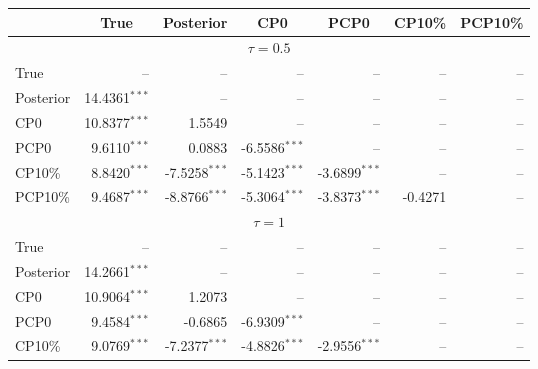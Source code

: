 { \renewcommand{\arraystretch}{1.2} 
 {\footnotesize 
\begin{table} 
\center 
\begin{tabular}{l | rrrrrr} 
& \multicolumn{1}{c}{True}& \multicolumn{1}{c}{Posterior}& \multicolumn{1}{c}{CP0}& \multicolumn{1}{c}{PCP0}& \multicolumn{1}{c}{CP10\%}& \multicolumn{1}{c}{PCP10\%} \\ \hline 
\multicolumn{7}{c}{$\tau = 0.5$} \\ \hline 
True &    --\phantom{$^{***}$} &    --\phantom{$^{***}$} &    --\phantom{$^{***}$} &    --\phantom{$^{***}$} &    --\phantom{$^{***}$} &    --\phantom{$^{***}$}   \\ 
Posterior & 14.4361$^{***}$ &    --\phantom{$^{***}$} &    --\phantom{$^{***}$} &    --\phantom{$^{***}$} &    --\phantom{$^{***}$} &    --\phantom{$^{***}$}   \\ 
CP0 & 10.8377$^{***}$ & 1.5549\phantom{$^{***}$} &    --\phantom{$^{***}$} &    --\phantom{$^{***}$} &    --\phantom{$^{***}$} &    --\phantom{$^{***}$}   \\ 
PCP0 & 9.6110$^{***}$ & 0.0883\phantom{$^{***}$} & -6.5586$^{***}$ &    --\phantom{$^{***}$} &    --\phantom{$^{***}$} &    --\phantom{$^{***}$}   \\ 
CP10\% & 8.8420$^{***}$ & -7.5258$^{***}$ & -5.1423$^{***}$ & -3.6899$^{***}$ &    --\phantom{$^{***}$} &    --\phantom{$^{***}$}   \\ 
PCP10\% & 9.4687$^{***}$ & -8.8766$^{***}$ & -5.3064$^{***}$ & -3.8373$^{***}$ & -0.4271\phantom{$^{***}$} &    --\phantom{$^{***}$}   \\ 
\hline 
\multicolumn{7}{c}{$\tau = 1$} \\ \hline 
True &    --\phantom{$^{***}$} &    --\phantom{$^{***}$} &    --\phantom{$^{***}$} &    --\phantom{$^{***}$} &    --\phantom{$^{***}$} &    --\phantom{$^{***}$}   \\ 
Posterior & 14.2661$^{***}$ &    --\phantom{$^{***}$} &    --\phantom{$^{***}$} &    --\phantom{$^{***}$} &    --\phantom{$^{***}$} &    --\phantom{$^{***}$}   \\ 
CP0 & 10.9064$^{***}$ & 1.2073\phantom{$^{***}$} &    --\phantom{$^{***}$} &    --\phantom{$^{***}$} &    --\phantom{$^{***}$} &    --\phantom{$^{***}$}   \\ 
PCP0 & 9.4584$^{***}$ & -0.6865\phantom{$^{***}$} & -6.9309$^{***}$ &    --\phantom{$^{***}$} &    --\phantom{$^{***}$} &    --\phantom{$^{***}$}   \\ 
CP10\% & 9.0769$^{***}$ & -7.2377$^{***}$ & -4.8826$^{***}$ & -2.9556$^{***}$ &    --\phantom{$^{***}$} &    --\phantom{$^{***}$}   \\ 

\end{tabular}
\end{table}}}
